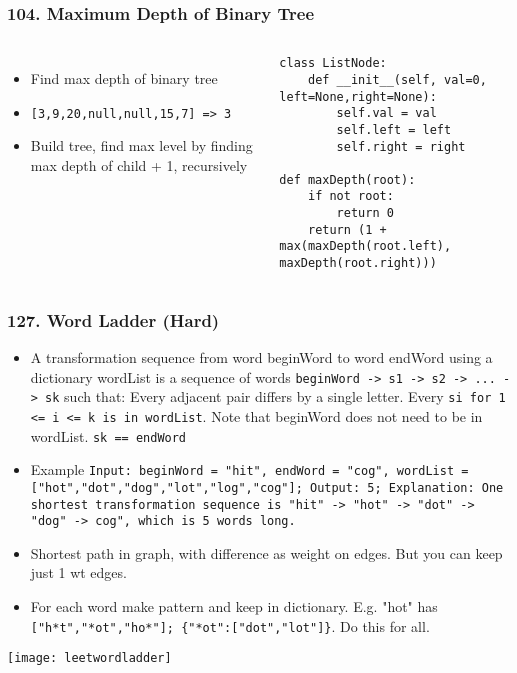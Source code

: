 \begin{frame}[fragile]\frametitle{104. Maximum Depth of Binary Tree}

	\begin{columns}[T]
	\begin{itemize}
	\item Find max depth of binary tree
	\item \lstinline{[3,9,20,null,null,15,7] => 3}
	\item Build tree, find max level by finding max depth of child + 1, recursively
	\end{itemize}
		\begin{lstlisting}[basicstyle=\scriptsize]
class ListNode:
    def __init__(self, val=0, left=None,right=None):
        self.val = val
        self.left = left
        self.right = right

def maxDepth(root):
    if not root:
        return 0
    return (1 + max(maxDepth(root.left), maxDepth(root.right)))
				\end{lstlisting}		

	\end{columns}
		
\end{frame}


\begin{frame}[fragile]\frametitle{127. Word Ladder (Hard)}

	\begin{itemize}
	\item A transformation sequence from word beginWord to word endWord using a dictionary wordList is a sequence of words \lstinline|beginWord -> s1 -> s2 -> ... -> sk| such that:
Every adjacent pair differs by a single letter.
Every \lstinline|si for 1 <= i <= k is in wordList|. Note that beginWord does not need to be in wordList.
\lstinline|sk == endWord|
	
	\item Example \lstinline|Input: beginWord = "hit", endWord = "cog", wordList = ["hot","dot","dog","lot","log","cog"]; Output: 5; Explanation: One shortest transformation sequence is "hit" -> "hot" -> "dot" -> "dog" -> cog", which is 5 words long.|
	\item Shortest path in graph, with difference as weight on edges. But you can keep just 1 wt edges. 
	\item For each word make pattern and keep in dictionary. E.g. "hot" has \lstinline|["h*t","*ot","ho*"]; {"*ot":["dot","lot"]}|. Do this for all.
	\end{itemize}
	
\begin{center}
\texttt{[image: leetwordladder]}
\end{center}	

\end{frame}

